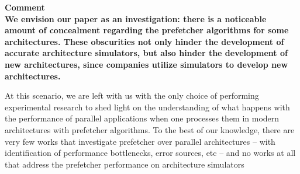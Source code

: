 \documentclass{article}
\newcounter{answer}
\newenvironment{answer}
{ \refstepcounter{answer}\vspace{0.5cm}\bfseries\noindent Comment~\theanswer\\ }
{ \vspace{0.5cm} }
\newcommand{\ms}[1]{\textcolor{orange}{\textbf{ msserpa: #1} }\vspace{0.2cm}}
\newcommand{\vsg}[1]{\textcolor{blue}{\textbf{vsgirelli: #1} }\vspace{0.2cm}}
\begin{document}
\begin{answer}
We envision our paper as an investigation: there is a noticeable amount of concealment regarding the prefetcher algorithms for some architectures. These obscurities not only hinder the development of accurate architecture simulators, but also hinder the development of new architectures, since companies utilize simulators to develop new architectures.

At this scenario, we are left with us with the only choice of performing experimental research to shed light on the understanding of what happens with the performance of parallel applications when one processes them in modern architectures with prefetcher algorithms. To the best of our knowledge, there are very few works that investigate prefetcher over parallel architectures -- with identification of performance bottlenecks, error sources, etc -- and no works at all that address the prefetcher performance on architecture simulators


\end{answer}
\end{document}

